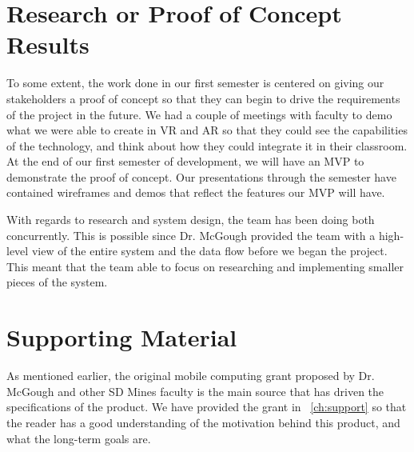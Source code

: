 \section{Research or Proof of Concept Results}


To some extent, the work done in our first semester is centered on giving our 
stakeholders a proof of concept so that they can begin to drive the requirements
of the project in the future. We had a couple of meetings with faculty to demo 
what we were able to create in VR and AR so that they could see the capabilities
of the technology, and think about how they could integrate it in their 
classroom. At the end of our first semester of development, we will have an MVP
to demonstrate the proof of concept. Our presentations through the semester have 
contained wireframes and demos that reflect the features our MVP will have.

With regards to research and system design, the team has been doing both
concurrently. This is possible since Dr. McGough provided the team with a 
high-level view of the entire system and the data flow before we began the 
project. This meant that the team able to focus on researching and implementing 
smaller pieces of the system. 


\section{Supporting Material}


As mentioned earlier, the original mobile computing grant proposed by Dr. 
McGough and other SD Mines faculty is the main source that has driven the
specifications of the product. We have provided the grant in 
~\autoref{ch:support} so that the reader has a good understanding of the
motivation behind this product, and what the long-term goals are.

